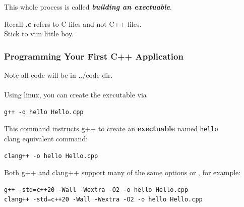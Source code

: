 \documentclass[10pt]{article}
\newcommand{\pbreak}{\vspace{30pt}}
\newcommand{\vocab}[1]{\fbox{\textbf{\textit{#1}}}}
\begin{document}
This whole process is called \textit{\textbf{building an exectuable}}.

\pbreak 

Recall \textbf{.c} refers to C files and not C++ files.\\ 

Stick to vim little boy.

\newpage
\subsubsection{Programming Your First C++ Application}
Note all code will be in ../code dir.\\ 

\\ 

Using linux, you can create the executable via 
\begin{verbatim}
g++ -o hello Hello.cpp
\end{verbatim}

This command instructs g++ to create an \textbf{exectuable} named \verb|hello|\\ 

clang equivalent command:
\begin{verbatim}
clang++ -o hello Hello.cpp
\end{verbatim}

\pbreak

Both g++ and clang++ support many of the same options or \vocab{flags}, for example:

\begin{verbatim}
g++ -std=c++20 -Wall -Wextra -O2 -o hello Hello.cpp
clang++ -std=c++20 -Wall -Wextra -O2 -o hello Hello.cpp
\end{verbatim}
\end{document}
